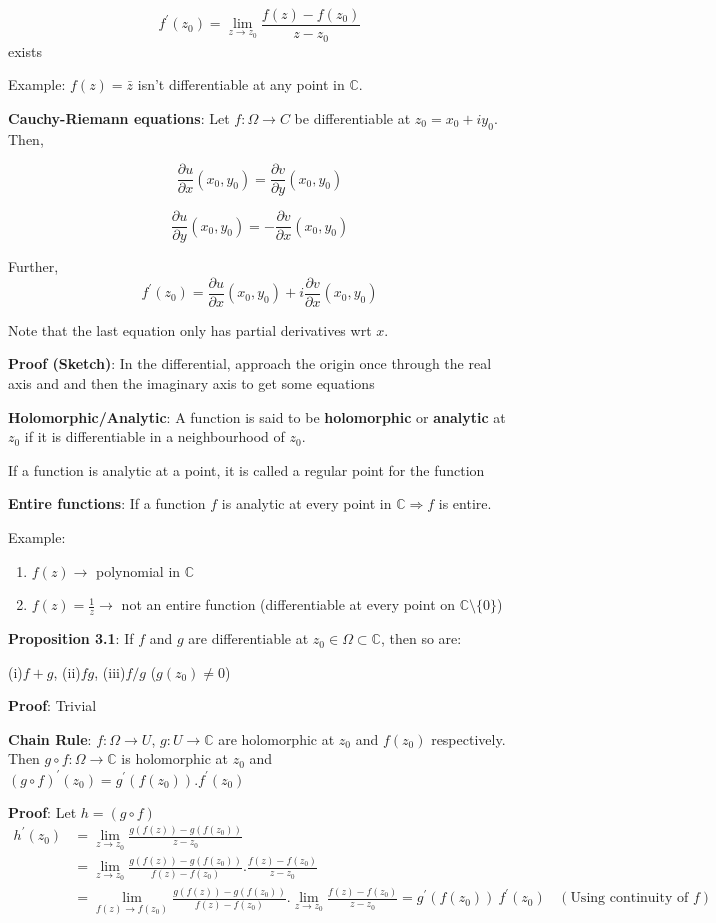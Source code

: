 \documentclass{article}
\begin{document}
\begin{flushleft}
$$f^{'}(z_0)= \lim_{z \to z_0} \frac{f(z)-f(z_0)}{z-z_0}$$ exists 

Example: $f(z)=\bar{z}$ isn't differentiable at any point in $\mathds{C}$.

\textbf{Cauchy-Riemann equations}: Let $f:\Omega \rightarrow C$ be differentiable at $z_0=x_0+iy_0$. Then,

$$\frac{\partial u}{\partial x}(x_0,y_0)=\frac{\partial v}{\partial y}(x_0,y_0)$$

$$\frac{\partial u}{\partial y}(x_0,y_0)= -\frac{\partial v}{\partial x}(x_0,y_0)$$

Further, $$f^{'}(z_0)= \frac{\partial u}{\partial x}(x_0,y_0)+i\frac{\partial v}{\partial x}(x_0,y_0)$$

Note that the last equation only has partial derivatives wrt $x$.

\textbf{Proof (Sketch)}: In the differential, approach the origin once through the real axis and and then the imaginary axis to get some equations  

\textbf{Holomorphic/Analytic}: A function is said to be \textbf{holomorphic} or \textbf{analytic} at $z_0$ if it is differentiable in a neighbourhood of $z_0$. 

If a function is analytic at a point, it is called a regular point for the function 

\textbf{Entire functions}: If a function $f$ is analytic at every point in $\mathds{C}\Rightarrow f$ is entire.

Example: 
\begin{enumerate}
\item $f(z)\rightarrow$ polynomial in $\mathds{C}$ 
\item$f(z)=\frac{1}{z}\rightarrow$ not an entire function (differentiable at every point on $\mathds{C}\setminus \{0\}$)
\end{enumerate}
\textbf{Proposition 3.1}: If $f$ and $g$ are differentiable at $z_0\in \Omega \subset \mathds{C}$, then so are:

(i)$f+g$, (ii)$fg$, (iii)$f/g$ ($g(z_0)\neq 0$)

\textbf{Proof}: Trivial

\textbf{Chain Rule}: $f:\Omega \rightarrow U$, $g:U\rightarrow \mathds{C}$ are holomorphic at $z_0$ and $f(z_0)$ respectively.
Then $g\circ f:\Omega\rightarrow \mathds{C}$ is holomorphic at $z_0$ and $(g\circ f)^{'}(z_0)=g^{'}(f(z_0)).f^{'}(z_0)$

\textbf{Proof}: Let $h=(g\circ f)$ 
\begin{equation*}
\begin{split}
h^{'}(z_0)&= \lim_{z \to z_0} \frac{g(f(z))-g(f(z_0))}{z-z_0} \\
&=\lim_{z \to z_0} \frac{g(f(z))-g(f(z_0))}{f(z)-f(z_0)}.\frac{f(z)-f(z_0)}{z-z_0} \\
&=\lim_{f(z) \to f(z_0)} \frac{g(f(z))-g(f(z_0))}{f(z)-f(z_0)}.\lim_{z \to z_0} \frac{f(z)-f(z_0)}{z-z_0}=g^{'}(f(z_0))\:f^{'}(z_0) \:\:\:\: (\text{Using continuity of $f$}) 
\end{split}
\end{equation*}


\end{flushleft}
\end{document}
